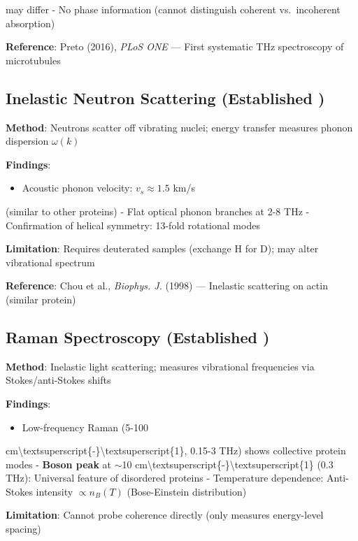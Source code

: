 may differ - No phase information (cannot distinguish coherent
vs.~incoherent absorption)

\textbf{Reference}: Preto (2016), \emph{PLoS ONE} --- First
systematic THz spectroscopy of microtubules

\subsection{Inelastic Neutron Scattering (Established
)}\label{inelastic-neutron-scattering-established}

\textbf{Method}: Neutrons scatter off vibrating nuclei; energy transfer
measures phonon dispersion \(\omega(k)\)

\textbf{Findings}:
\begin{itemize}
\item Acoustic phonon velocity: \(v_s \approx 1.5\) km/s
\end{itemize}

(similar to other proteins) - Flat optical phonon branches at 2-8 THz -
Confirmation of helical symmetry: 13-fold rotational modes

\textbf{Limitation}: Requires deuterated samples (exchange H for D); may
alter vibrational spectrum

\textbf{Reference}: Chou et al., \emph{Biophys. J.} (1998) ---
Inelastic scattering on actin (similar protein)

\subsection{Raman Spectroscopy (Established
)}\label{raman-spectroscopy-established}

\textbf{Method}: Inelastic light scattering; measures vibrational
frequencies via Stokes/anti-Stokes shifts

\textbf{Findings}:
\begin{itemize}
\item Low-frequency Raman (5-100
\end{itemize}

cm\textbackslash textsuperscript\{-\}\textbackslash textsuperscript\{1\},
0.15-3 THz) shows collective protein modes - \textbf{Boson peak} at
$\sim$10
cm\textbackslash textsuperscript\{-\}\textbackslash textsuperscript\{1\}
(0.3 THz): Universal feature of disordered proteins - Temperature
dependence: Anti-Stokes intensity \(\propto n_B(T)\) (Bose-Einstein
distribution)

\textbf{Limitation}: Cannot probe coherence directly (only measures
energy-level spacing)

